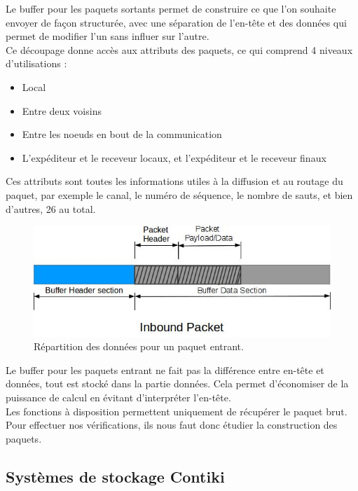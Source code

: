 			
			Le buffer pour les paquets sortants permet de construire ce que l'on souhaite envoyer de façon structurée, avec une séparation de l'en-tête et des données qui permet de modifier l'un sans influer sur l'autre. \\
			Ce découpage donne accès aux attributs des paquets, ce qui comprend 4 niveaux d'utilisations :
			\begin{itemize}
				\item Local
				\item Entre deux voisins
				\item Entre les noeuds en bout de la communication
				\item L'expéditeur et le receveur locaux, et l'expéditeur et le receveur finaux
			\end{itemize}
			Ces attributs sont toutes les informations utiles à la diffusion et au routage du paquet, par exemple le canal, le numéro de séquence, le nombre de sauts, et bien d'autres, 26 au total.
			
			\clearpage
			
			\begin{figure}[htp]
				\centering
				\includegraphics[width=13cm]{images/In.jpg}
				\caption{Répartition des données pour un paquet entrant.}
				\label{fig:inbuf}
			\end{figure}
			
			Le buffer pour les paquets entrant ne fait pas la différence entre en-tête et données, tout est stocké dans la partie données. Cela permet d'économiser de la puissance de calcul en évitant d'interpréter l'en-tête.\\
			Les fonctions à disposition permettent uniquement de récupérer le paquet brut. Pour effectuer nos vérifications, ils nous faut donc étudier la construction des paquets.
	
	\subsection{Systèmes de stockage Contiki}
		
